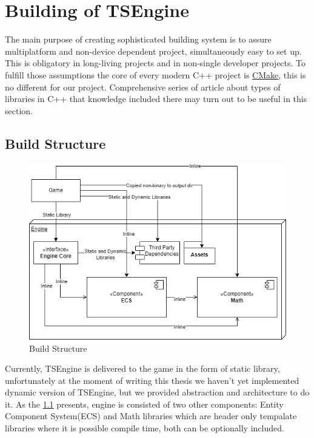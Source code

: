 \newpage
\section{Building of TSEngine}
\label{sec:build}
The main purpose of creating sophisticated building system is to assure multiplatform and non-device dependent project, simultaneously easy to set up.\\ This is obligatory in long-living projects and in non-single developer projects.
To fulfill those assumptions the core of every modern C++ project is \hyperref[sec:stack_cmake]{CMake}, this is no different for our project.
Comprehensive series of article about types of libraries in C++ \cite{cpplibs} that knowledge included there may turn out to be useful in this section.
\subsection{Build Structure}
\label{fig:build_struct}
\begin{figure}[h]
  \includegraphics[width=\linewidth]{figures/build.png}
  \caption{Build Structure}
\end{figure}
Currently, TSEngine is delivered to the game in the form of static library, unfortunately at the moment of writing this thesis we haven't yet implemented dynamic version of TSEngine, but we provided abstraction and architecture to do it.
As the \ref{fig:build_struct} presents, engine is consisted of two other components: Entity Component System(ECS) and Math libraries which are header only tempalate libraries where it is possible compile time, both can be optionally included.

